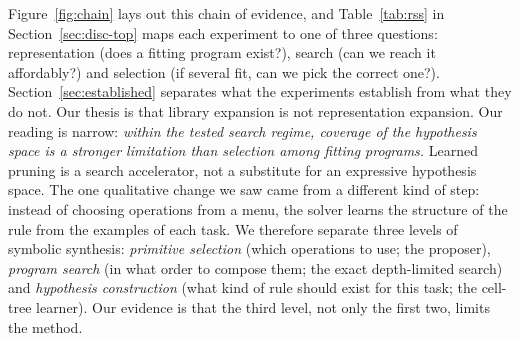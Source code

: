 \documentclass[sigconf,nonacm]{acmart}
\begin{document}
Figure~\ref{fig:chain} lays out this chain of evidence, and Table~\ref{tab:rss} in Section~\ref{sec:disc-top} maps each experiment to one of three questions: representation (does a fitting program exist?), search (can we reach it affordably?) and selection (if several fit, can we pick the correct one?). Section~\ref{sec:established} separates what the experiments establish from what they do not. Our thesis is that library expansion is not representation expansion. Our reading is narrow: \emph{within the tested search regime, coverage of the hypothesis space is a stronger limitation than selection among fitting programs.} Learned pruning is a search accelerator, not a substitute for an expressive hypothesis space. The one qualitative change we saw came from a different kind of step: instead of choosing operations from a menu, the solver learns the structure of the rule from the examples of each task. We therefore separate three levels of symbolic synthesis: \emph{primitive selection} (which operations to use; the proposer), \emph{program search} (in what order to compose them; the exact depth-limited search) and \emph{hypothesis construction} (what kind of rule should exist for this task; the cell-tree learner). Our evidence is that the third level, not only the first two, limits the method.
\end{document}
